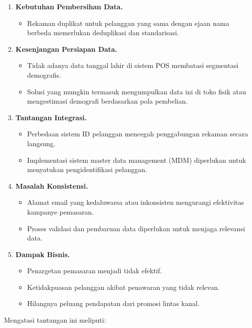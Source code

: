 \begin{enumerate}
	\item \textbf{Kebutuhan Pembersihan Data.}
	\begin{itemize}
		\item Rekaman duplikat untuk pelanggan yang sama dengan ejaan nama berbeda memerlukan deduplikasi dan standarisasi.
	\end{itemize}
	
	\item \textbf{Kesenjangan Persiapan Data.}
	\begin{itemize}
		\item Tidak adanya data tanggal lahir di sistem POS membatasi segmentasi demografis.
		\item Solusi yang mungkin termasuk mengumpulkan data ini di toko fisik atau mengestimasi demografi berdasarkan pola pembelian.
	\end{itemize}
	
	\item \textbf{Tantangan Integrasi.}
	\begin{itemize}
		\item Perbedaan sistem ID pelanggan mencegah penggabungan rekaman secara langsung.
		\item Implementasi sistem master data management (MDM) diperlukan untuk menyatukan pengidentifikasi pelanggan.
	\end{itemize}
	
	\item \textbf{Masalah Konsistensi.}
	\begin{itemize}
		\item Alamat email yang kedaluwarsa atau inkonsisten mengurangi efektivitas kampanye pemasaran.
		\item Proses validasi dan pembaruan data diperlukan untuk menjaga relevansi data.
	\end{itemize}
	
	\item \textbf{Dampak Bisnis.}
	\begin{itemize}
		\item Penargetan pemasaran menjadi tidak efektif.
		\item Ketidakpuasan pelanggan akibat penawaran yang tidak relevan.
		\item Hilangnya peluang pendapatan dari promosi lintas kanal.
	\end{itemize}
\end{enumerate}

Mengatasi tantangan ini meliputi:

